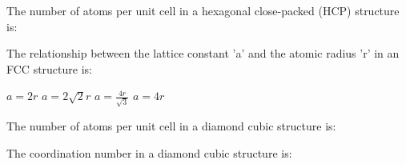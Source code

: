\begin{question}[2]
The number of atoms per unit cell in a hexagonal close-packed (HCP) structure is:

\begin{oneparcheckboxes}
\end{oneparcheckboxes}
\end{question}

\begin{question}[2]
The relationship between the lattice constant 'a' and the atomic radius 'r' in an FCC structure is:

\begin{oneparcheckboxes}
\choice $\displaystyle a = 2r$
\correctchoice $\displaystyle a = 2\sqrt{2}r$
\choice $\displaystyle a = \frac{4r}{\sqrt{3}}$
\choice $\displaystyle a = 4r$
\end{oneparcheckboxes}
\end{question}

\begin{question}[2]
The number of atoms per unit cell in a diamond cubic structure is:

\begin{oneparcheckboxes}
\end{oneparcheckboxes}
\end{question}

\begin{question}[2]
The coordination number in a diamond cubic structure is:

\begin{oneparcheckboxes}
\end{oneparcheckboxes}
\end{question} 